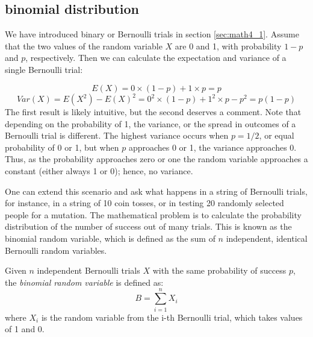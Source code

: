 \documentclass[
  letterpaper,
  DIV=11,
  numbers=noendperiod]{scrreprt}
\begin{document}
\hypertarget{binomial-distribution}{%
\subsection{binomial distribution}\label{binomial-distribution}}

We have introduced binary or Bernoulli trials in section
\ref{sec:math4_1}. Assume that the two values of the random variable
\(X\) are 0 and 1, with probability \(1-p\) and \(p\), respectively.
Then we can calculate the expectation and variance of a single Bernoulli
trial:

\[E(X) = 0 \times (1-p) + 1 \times p = p\]
\[ Var(X) = E(X^2) - E(X)^2 = 0^2 \times (1-p) + 1^2 \times p - p^2= p(1-p)\]
The first result is likely intuitive, but the second deserves a comment.
Note that depending on the probability of 1, the variance, or the spread
in outcomes of a Bernoulli trial is different. The highest variance
occurs when \(p=1/2\), or equal probability of 0 or 1, but when \(p\)
approaches 0 or 1, the variance approaches 0. Thus, as the probability
approaches zero or one the random variable approaches a constant (either
always 1 or 0); hence, no variance.

One can extend this scenario and ask what happens in a string of
Bernoulli trials, for instance, in a string of 10 coin tosses, or in
testing 20 randomly selected people for a mutation. The mathematical
problem is to calculate the probability distribution of the number of
success out of many trials. This is known as the binomial random
variable, which is defined as the sum of \(n\) independent, identical
Bernoulli random variables.

\begin{tcolorbox}[enhanced jigsaw, coltitle=black, arc=.35mm, opacitybacktitle=0.6, breakable, bottomtitle=1mm, toptitle=1mm, titlerule=0mm, colback=white, leftrule=.75mm, rightrule=.15mm, colframe=quarto-callout-note-color-frame, colbacktitle=quarto-callout-note-color!10!white, opacityback=0, title=\textcolor{quarto-callout-note-color}{\faInfo}\hspace{0.5em}{Definition}, left=2mm, toprule=.15mm, bottomrule=.15mm]

Given \(n\) independent Bernoulli trials \(X\) with the same probability
of success \(p\), the \emph{binomial random variable} is defined as:
\[B = \sum_{i=1}^n X_i\] where \(X_i\) is the random variable from the
i-th Bernoulli trial, which takes values of 1 and 0.

\end{tcolorbox}
\end{document}
